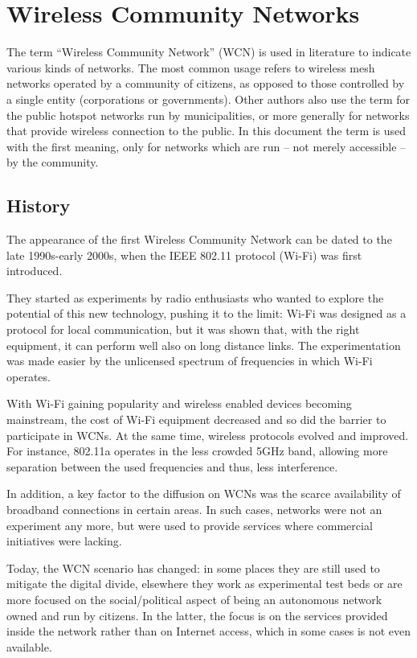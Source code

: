 \documentclass[oneside,openany]{memoir}
\begin{document}
\chapter{Wireless Community Networks}\label{wireless-community-networks}

The term ``Wireless Community Network'' (WCN) is used in literature to
indicate various kinds of networks. The most common usage refers to
wireless mesh networks operated by a community of citizens, as opposed
to those controlled by a single entity (corporations or governments).
Other authors also use the term for the public hotspot networks run by
municipalities, or more generally for networks that provide wireless
connection to the public. In this document the term is used with the
first meaning, only for networks which are run -- not merely accessible
-- by the community.


\section{History}\label{history}

The appearance of the first Wireless Community Network can be dated to
the late 1990s-early 2000s, when the IEEE 802.11 protocol (Wi-Fi) was
first introduced.

They started as experiments by radio enthusiasts who
wanted to explore the potential of this new technology, pushing it to
the limit: Wi-Fi was designed as a protocol for local communication, but
it was shown that, with the right equipment, it can perform well also on
long distance links. The experimentation was made easier by the
unlicensed spectrum of frequencies in which Wi-Fi operates.

With Wi-Fi gaining popularity and wireless enabled devices becoming
mainstream, the cost of Wi-Fi equipment decreased and so did the barrier
to participate in WCNs. At the same time, wireless protocols evolved and
improved. For instance, 802.11a operates in the less crowded 5GHz band,
allowing more separation between the used frequencies and thus, less
interference.

In addition, a key factor to the diffusion on WCNs was the
scarce availability of broadband connections in certain areas. In such
cases, networks were not an experiment any more, but were used to provide
services where commercial initiatives were lacking.

Today, the WCN scenario has changed: in some places they are still used to
mitigate the digital divide, elsewhere they work as experimental
test beds or are more focused on the social/political aspect of being an
autonomous network owned and run by citizens. In the latter, the focus
is on the services provided inside the network rather than on Internet
access, which in some cases is not even available.
\end{document}
